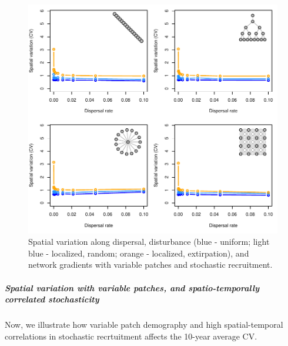 \documentclass[]{article}
\let\oldsubparagraph\subparagraph
\renewcommand{\subparagraph}[1]{\oldsubparagraph{#1}\mbox{}}
\begin{document}
\begin{figure}[H]

{\centering \includegraphics{Managing_for_ecological_surprises_in_metapopulations_makeHTML_files/figure-latex/CV with variable patches and stochasticity-1} 

}

\caption{Spatial variation along dispersal, disturbance (blue - uniform; light blue - localized, random; orange - localized, extirpation), and network gradients with variable patches and stochastic recruitment.}\label{fig:CV with variable patches and stochasticity}
\end{figure}

\subparagraph{Spatial variation with variable patches, and
spatio-temporally correlated
stochasticity}\label{spatial-variation-with-variable-patches-and-spatio-temporally-correlated-stochasticity}

Now, we illustrate how variable patch demography and high
spatial-temporal correlations in stochastic recrtuitment affects the
10-year average CV.
\end{document}
